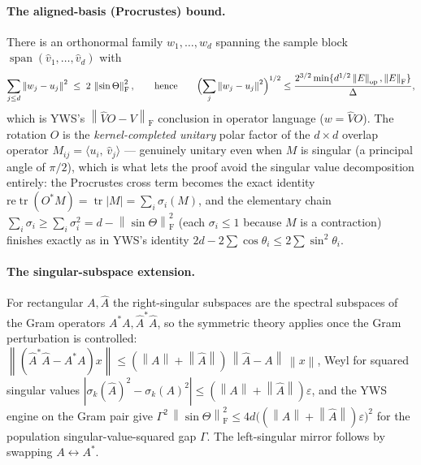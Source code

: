 \documentclass[11pt]{article}
\newcommand{\norm}[1]{\left\lVert #1\right\rVert}
\newcommand{\eps}{\varepsilon}
\newcommand{\F}{\mathrm{F}}
\newcommand{\op}{\mathrm{op}}
\newcommand{\inner}[2]{\langle #1,\,#2\rangle}
\newcommand{\sinT}{\sin\Theta}
\DeclareMathOperator{\tr}{tr}
\DeclareMathOperator{\spann}{span}
\theoremstyle{remark}
\begin{document}
\paragraph{The aligned-basis (Procrustes) bound.}
There is an orthonormal family $w_1,\dots,w_d$ spanning the sample block
$\spann(\widehat v_1,\dots,\widehat v_d)$ with
\[
  \sum_{j\le d}\norm{w_j-u_j}^2\;\le\;2\,\norm{\sinT}_{\F}^2,
  \qquad\text{hence}\qquad
  \Bigl(\sum_j\norm{w_j-u_j}^2\Bigr)^{1/2}
  \le\frac{2^{3/2}\min\{d^{1/2}\norm{E}_{\op},\norm{E}_{\F}\}}{\Delta},
\]
which is YWS's $\norm{\widehat VO-V}_{\F}$ conclusion in operator language
($w=\widehat VO$).  The rotation $O$ is the \emph{kernel-completed unitary}
polar factor of the $d\times d$ overlap operator $M_{ij}=\inner{u_i}{\widehat
v_j}$ --- genuinely unitary even when $M$ is singular (a principal angle of
$\pi/2$), which is what lets the proof avoid the singular value decomposition
entirely: the Procrustes cross term becomes the exact identity
$\mathrm{re}\tr(O^{*}M)=\tr\lvert M\rvert=\sum_i\sigma_i(M)$, and the
elementary chain $\sum_i\sigma_i\ge\sum_i\sigma_i^2=d-\norm{\sinT}_{\F}^2$
(each $\sigma_i\le 1$ because $M$ is a contraction) finishes exactly as in
YWS's identity $2d-2\sum\cos\theta_i\le2\sum\sin^2\theta_i$.

\paragraph{The singular-subspace extension.}
For rectangular $A,\widehat A$ the right-singular subspaces are the spectral
subspaces of the Gram operators $A^{*}A,\widehat A^{*}\widehat A$, so the
symmetric theory applies once the Gram perturbation is controlled:
$\norm{(\widehat A^{*}\widehat A-A^{*}A)x}\le(\norm{A}+\norm{\widehat
A})\,\norm{\widehat A-A}\,\norm{x}$, Weyl for squared singular values
$|\sigma_k(\widehat A)^2-\sigma_k(A)^2|\le(\norm{A}+\norm{\widehat A})\eps$,
and the YWS engine on the Gram pair give
$\Gamma^2\,\norm{\sinT}_{\F}^2\le 4d\bigl((\norm{A}+\norm{\widehat
A})\eps\bigr)^2$ for the population singular-value-squared gap $\Gamma$.  The
left-singular mirror follows by swapping $A\leftrightarrow A^{*}$.
\end{document}
